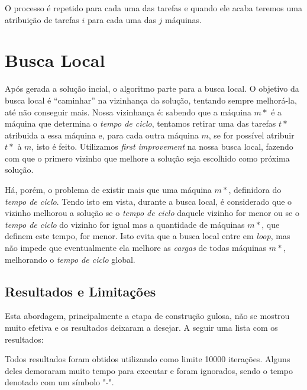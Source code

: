\documentclass{report}
\begin{document}
O processo é repetido para cada uma das tarefas e quando ele acaba teremos
uma atribuição de tarefas $i$ para cada uma das $j$ máquinas.

\section{Busca Local}

Após gerada a solução incial, o algoritmo parte para a busca local.
O objetivo da busca local é ``caminhar'' na
vizinhança da solução, tentando sempre melhorá-la, até não conseguir mais.
Nossa vizinhança é: sabendo que a máquina $m*$
é a máquina que determina o \emph{tempo de ciclo},
tentamos retirar uma das tarefas $t*$ atribuida a essa máquina e, para cada
outra máquina $m$, se for possível atribuir $t*$ à $m$, isto é feito.
Utilizamos \textit{first improvement} na nossa busca
local, fazendo com que o primero vizinho que melhore a solução seja
escolhido como próxima solução.

Há, porém, o problema de existir mais que uma máquina $m*$,
definidora do \emph{tempo de ciclo}. Tendo isto em vista,
durante a busca local, é considerado que o vizinho melhorou a
solução se o \emph{tempo de ciclo} daquele vizinho for
menor ou se o \emph{tempo de ciclo} do vizinho for igual mas a
quantidade de máquinas $m*$, que definem este tempo, for
menor. Isto evita que a busca local entre em \emph{loop}, mas não impede que
eventualmente ela melhore as \emph{cargas} de
todas máquinas $m*$, melhorando o \emph{tempo de ciclo} global.

\subsection{Resultados e Limitações}

Esta abordagem, principalmente a etapa de construção gulosa, não se mostrou muito
efetiva e os resultados deixaram a desejar. A seguir uma lista com os resultados:

Todos resultados foram obtidos utilizando como limite 10000 iterações. Alguns deles
demoraram muito tempo para executar e foram ignorados, sendo o tempo denotado com
um símbolo "-".
\end{document}
